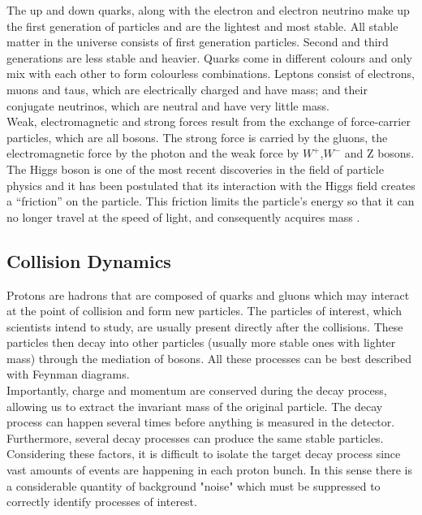 \documentclass[runningheads,a4paper]{llncs}
\begin{document}
The up and down quarks, along with the electron and electron neutrino make up the first generation of particles and are the lightest and most stable. All stable matter in the universe consists of first generation particles. Second and third generations are less stable and heavier. Quarks come in different colours and only mix with each other to form colourless combinations. Leptons consist of electrons, muons and taus, which are electrically charged and have mass; and their conjugate neutrinos, which are neutral and have very little mass.\\

Weak, electromagnetic and strong forces result from the exchange of force-carrier particles, which are all bosons. The strong force is carried by the gluons, the electromagnetic force by the photon and the weak force by ${W}^{+}$,${W}^{-}$ and Z bosons.\\

The Higgs boson is one of the most recent discoveries in the field of particle physics and it has been postulated that its interaction with the Higgs field creates a “friction” on the particle. This friction limits the particle’s energy so that it can no longer travel at the speed of light, and consequently acquires mass  \cite{melnikov2010w+}.\\

\pagebreak
\subsection{Collision Dynamics}

Protons are hadrons that are composed of quarks and gluons which may interact at the point of collision and form new particles. The particles of interest, which scientists intend to study, are usually present directly after the collisions. These particles then decay into other particles (usually more stable ones with lighter mass) through the mediation of bosons. All these processes can be best described with Feynman diagrams.\\

Importantly, charge and momentum are conserved during the decay process, allowing us to extract the invariant mass of the original particle. The decay process can happen several times before anything is measured in the detector. Furthermore, several decay processes can produce the same stable particles. Considering these factors, it is difficult to isolate the target decay process since vast amounts of events are happening in each proton bunch. In this sense there is a considerable quantity of background "noise" which must be suppressed to correctly identify processes of interest.
\end{document}
